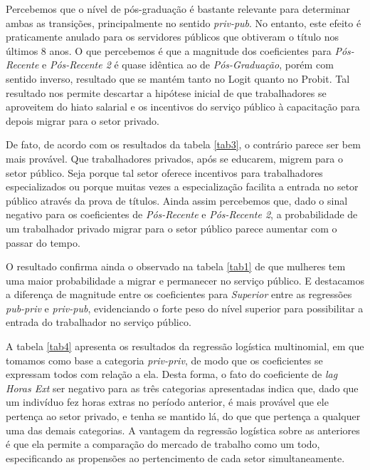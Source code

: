 \documentclass[a4paper]{article}
\begin{document}
Percebemos que o nível de pós-graduação é bastante relevante para determinar ambas as transições, principalmente no sentido \textit{priv-pub}. No entanto, este efeito é praticamente anulado para os servidores públicos que obtiveram o título nos últimos 8 anos. O que percebemos é que a magnitude dos coeficientes para \textit{Pós-Recente} e \textit{Pós-Recente 2} é quase idêntica ao de \textit{Pós-Graduação}, porém com sentido inverso, resultado que se mantém tanto no Logit quanto no Probit. Tal resultado nos permite descartar a hipótese inicial de que trabalhadores se aproveitem do hiato salarial e os incentivos do serviço público à capacitação para depois migrar para o setor privado.

De fato, de acordo com os resultados da tabela \ref{tab3}, o contrário parece ser bem mais provável. Que trabalhadores privados, após se educarem, migrem para o setor público. Seja porque tal setor oferece incentivos para trabalhadores especializados ou porque muitas vezes a especialização facilita a entrada no setor público através da prova de títulos. Ainda assim percebemos que, dado o sinal negativo para os coeficientes de \textit{Pós-Recente} e \textit{Pós-Recente 2}, a probabilidade de um trabalhador privado migrar para o setor público parece aumentar com o passar do tempo.

O resultado confirma ainda o observado na tabela \ref{tab1} de que mulheres tem uma maior probabilidade a migrar e permanecer no serviço público. E destacamos a diferença de magnitude entre os coeficientes para \textit{Superior} entre as regressões \textit{pub-priv} e \textit{priv-pub}, evidenciando o forte peso do nível superior para possibilitar a entrada do trabalhador no serviço público.

A tabela \ref{tab4} apresenta os resultados da regressão logística multinomial, em que tomamos como base a categoria \textit{priv-priv}, de modo que os coeficientes se expressam todos com relação a ela. Desta forma, o fato do coeficiente de \textit{lag Horas Ext} ser negativo para as três categorias apresentadas indica que, dado que um indivíduo fez horas extras no período anterior, é mais provável que ele pertença ao setor privado, e tenha se mantido lá, do que que pertença a qualquer uma das demais categorias. A vantagem da regressão logística sobre as anteriores é que ela permite a comparação do mercado de trabalho como um todo, especificando as propensões ao pertencimento de cada setor simultaneamente.
\end{document}
